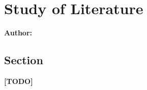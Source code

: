 \chapter{Study of Literature}

\textbf{Author: } 

\section{Section}
\textbf{[TODO]}
\newline
\lipsum[1]

\filbreak